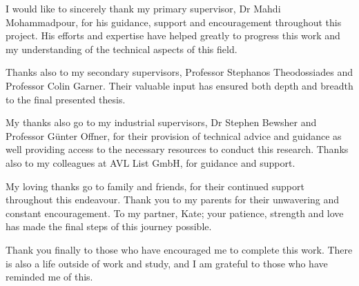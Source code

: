 
\begin{acknowledgements}      

I would like to sincerely thank my primary supervisor, Dr Mahdi Mohammadpour, for his guidance, support and encouragement throughout this project. His efforts and expertise have helped greatly to progress this work and my understanding of the technical aspects of this field. 

Thanks also to my secondary supervisors, Professor Stephanos Theodossiades and Professor Colin Garner. Their valuable input has ensured both depth and breadth to the final presented thesis. 

My thanks also go to my industrial supervisors, Dr Stephen Bewsher and Professor Günter Offner, for their provision of technical advice and guidance as well providing access to the necessary resources to conduct this research. Thanks also to my colleagues at AVL List GmbH, for guidance and support.

My loving thanks go to family and friends, for their continued support throughout this endeavour. Thank you to my parents for their unwavering and constant encouragement. To my partner, Kate; your patience, strength and love has made the final steps of this journey possible.

Thank you finally to those who have encouraged me to complete this work. There is also a life outside of work and study, and I am grateful to those who have reminded me of this.

\end{acknowledgements}
